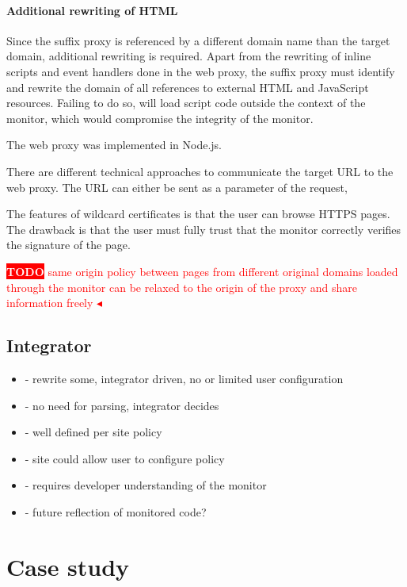 \documentclass{llncs}
\newcommand{\todo}[1]{\colorbox{red}{\textcolor{white}{\sffamily\bfseries\scriptsize TODO}} \textcolor{red}{#1} \textcolor{red}{$\blacktriangleleft$}}
\begin{document}
\paragraph{Additional rewriting of HTML}
Since the suffix proxy is referenced by a different domain name than the target 
domain, additional rewriting is required. Apart from the rewriting of inline 
scripts and event handlers done in the web proxy, the suffix proxy must 
identify and rewrite the domain of all references to external HTML and 
JavaScript resources. Failing to do so, will load script code outside the 
context of the monitor, which would compromise the integrity of the monitor.

The web proxy was implemented in Node.js. 

There are different technical approaches to communicate the target URL to the web 
proxy. The URL can either be sent as a parameter of the request, 

The features of wildcard certificates is that the user can browse HTTPS pages. The drawback is that the user must fully trust that the monitor correctly verifies the signature of the page.

\todo{same origin policy between pages from different original domains loaded through the monitor can be relaxed to the origin of the proxy and share information freely}



\subsection{Integrator}

\begin{itemize}
\item- rewrite some, integrator driven, no or limited user configuration
\item- no need for parsing, integrator decides
\item- well defined per site policy
\item- site could allow user to configure policy
\item- requires developer understanding of the monitor
\item- future reflection of monitored code?
\end{itemize}


\section{Case study}
\label{sec:case}
\end{document}
